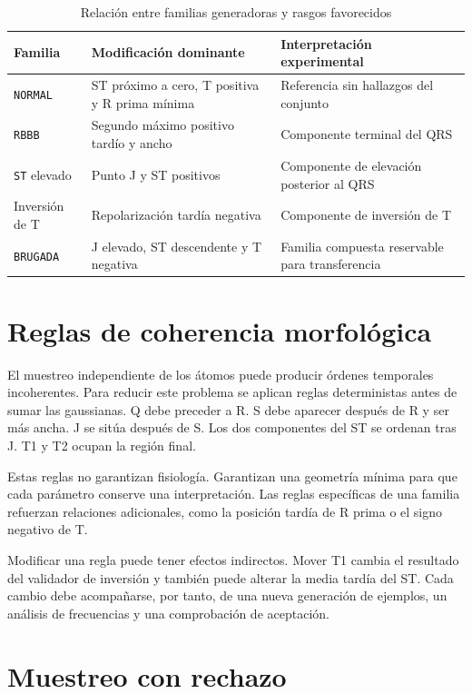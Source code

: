 \begin{table}[H]
\centering
\small
\begin{tabularx}{\textwidth}{p{3.1cm} p{4.4cm} X}
\toprule
\textbf{Familia} & \textbf{Modificación dominante} & \textbf{Interpretación experimental} \\
\midrule
\texttt{NORMAL} & ST próximo a cero, T positiva y R prima mínima & Referencia sin hallazgos del conjunto \\
\texttt{RBBB} & Segundo máximo positivo tardío y ancho & Componente terminal del QRS \\
\texttt{ST} elevado & Punto J y ST positivos & Componente de elevación posterior al QRS \\
Inversión de T & Repolarización tardía negativa & Componente de inversión de T \\
\texttt{BRUGADA} & J elevado, ST descendente y T negativa & Familia compuesta reservable para transferencia \\
\bottomrule
\end{tabularx}
\caption{Relación entre familias generadoras y rasgos favorecidos}
\label{tab:familias}
\end{table}

\section{Reglas de coherencia morfológica}

El muestreo independiente de los átomos puede producir órdenes temporales incoherentes. Para reducir este problema se aplican reglas deterministas antes de sumar las gaussianas. Q debe preceder a R. S debe aparecer después de R y ser más ancha. J se sitúa después de S. Los dos componentes del ST se ordenan tras J. T1 y T2 ocupan la región final.

Estas reglas no garantizan fisiología. Garantizan una geometría mínima para que cada parámetro conserve una interpretación. Las reglas específicas de una familia refuerzan relaciones adicionales, como la posición tardía de R prima o el signo negativo de T.

Modificar una regla puede tener efectos indirectos. Mover T1 cambia el resultado del validador de inversión y también puede alterar la media tardía del ST. Cada cambio debe acompañarse, por tanto, de una nueva generación de ejemplos, un análisis de frecuencias y una comprobación de aceptación.

\section{Muestreo con rechazo}

